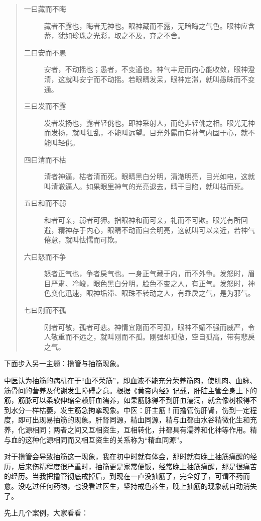\begin{quotation}
    \begin{description}
        \item[一曰藏而不晦] 藏者不露也，晦者无神也。眼神藏而不露，无暗晦之气色。眼神应含蓄，犹如珍珠之光彩，取之不及，弃之不舍。
        \item[二曰安而不愚] 安者，不动摇也；愚者，不变通也。神气丰足而内心能收敛，眼神澄清，这就叫安宁而不动摇。若眼睛发呆，眼神定滞，就叫愚昧而不变通。
        \item[三曰发而不露] 发者发扬也，露者轻佻也。即神采射人，而绝非轻佻之相。眼光无神而发扬，就叫狂乱，不能叫远望。目光外露而有神气内固于心，就不能叫轻佻。
        \item[四曰清而不枯] 清者神逼，枯者清而死。眼睛黑白分明，清澈明亮，目光如电，这就叫清澈逼人。如果眼里神气的光亮退去，睛干目陷，就叫枯而死。
        \item[五曰和而不弱] 和者可亲，弱者可狎。指眼神和而可亲，礼而不可欺。眼光有所回避，精神存于内心，眼睛不动而自会明亮，这就叫可以亲近，若神气倦怠，就叫怯懦而可欺。
        \item[六曰怒而不争] 怒者正气也，争者戾气也。一身正气藏于内，而不外争。发怒时，眉目严肃、冷峻，眼色黑白分明，脸色不变之人，有正气。发怒时，神色变化迅速，眼神垢滞、眼珠不转动之人，有乖戾之气，是为邪气。
        \item[七曰刚而不孤] 刚者可敬，孤者可悲。神情宜刚而不可孤，眼神不媚不强而威严，令人敬重而不远之，就叫刚而不孤。刚强却孤傲，空自孤高，带有悲戾之气。
    \end{description}
\end{quotation}

下面步入另一主题：撸管与抽筋现象。

中医认为抽筋的病机在于“血不荣筋”，即血液不能充分荣养筋肉，使肌肉、血脉、筋骨间的营养及代谢发生障碍之意。根据《黄帝内经》记载，肝脏主管全身上下的筋，筋脉可以柔软伸缩全赖肝血濡养，如果筋脉得不到肝血濡润，就会像树根得不到水分一样枯萎，发生筋急拘挛现象。中医：肝主筋！而撸管伤肝肾，伤到一定程度，即可出现易抽筋的现象。肝肾同源，精血同源，精与血都由水谷精微化生和充养，化源相同；两者之间又互相资生，互相转化，并都具有濡养和化神等作用。精与血的这种化源相同而又相互资生的关系称为“精血同源”。

对于撸管会导致抽筋这一现象，我在初中时就有体会，那时就有晚上抽筋痛醒的经历，后来伤精程度很严重时，抽筋更是家常便饭，经常晚上抽筋痛醒，那是很痛苦的经历。当我把撸管彻底戒掉后，到现在一直没抽筋了，完全好了，可谓不药而愈。没吃过任何药物，也没看过医生，坚持戒色养生，晚上抽筋的现象就自动消失了。

先上几个案例，大家看看：

